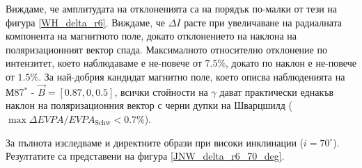 Виждаме, че амплитудата на отклоненията са на порядък по-малки от тези на фигура \ref{WH_delta_r6}. Виждаме, че $\Delta I$ расте при увеличаване на радиалната компонента на магнитното поле, докато отклонението на наклона на поляризационният вектор спада. Максималното относително отклонение по интензитет, което наблюдаваме е не-повече от $7.5\%$, докато по наклон е не-повече от $1.5\%$. За най-добрия кандидат магнитно поле, което описва наблюденията на М87$^*$ - $\vec{B} = [0.87, 0, 0.5]$, всички стойности на $\gamma$ дават практически еднакъв наклон на поляризационния вектор с черни дупки на Шварцшилд ($\max \Delta EVPA / EVPA_\text{Schw}<0.7\%$).\newpage

За пълнота изследваме и директните образи при високи инклинации ($i = 70^\circ$). Резултатите са представени на фигура \ref{JNW_delta_r6_70_deg}.

